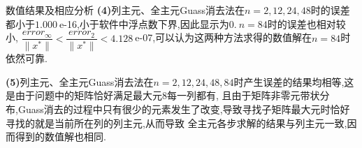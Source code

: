 \documentclass{article}
\begin{document}
\begin{section}{数值结果及相应分析}
        \noindent\textbf{(4)}列主元、全主元Guass消去法在$n=2,12,24,48$时的误差都小于$1.000\ $e-16,小于软件中浮点数下界,因此显示为$0$.$\ n=84$时的误差也相对较小,
        $\dfrac{error_{\infty}}{\| x^*\|}<\dfrac{error_2}{\| x^*\|}<4.128\ $e-07,可以认为这两种方法求得的数值解在$n=84$时依然可靠.

        \noindent\textbf{(5)}列主元、全主元Guass消去法在$n=2,12,24,48,84$时产生误差的结果均相等,这是由于问题中的矩阵恰好满足最大元$8$每一列都有,
        且由于矩阵非零元带状分布,Guass消去的过程中只有很少的元素发生了改变,导致寻找子矩阵最大元时恰好寻找的就是当前所在列的列主元,从而导致
        全主元各步求解的结果与列主元一致,因而得到的数值解也相同.
        
        
\end{section}
\end{document}
